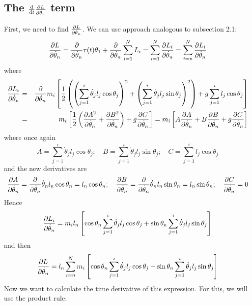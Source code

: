 \documentclass[12pt]{article}
\begin{document}
	\subsection{The $\dv{t}\pdv{L}{\dot{\theta}_n}$ term}
	
	First, we need to find $\pdv{L}{\dot{\theta}_n}$. We can use approach analogous to subsection 2.1:
	$$\pdv{L}{\dot{\theta}_n}=\pdv{}{\dot{\theta}_n}\tau(t)\theta_1+\pdv{\dot{\theta}_n}\sum_{i=1}^N L_i=\sum_{i=1}^N \pdv{L_i}{\dot{\theta}_n}=\sum_{i=n}^N \pdv{L_i}{\dot{\theta}_n}$$
	where
	\begin{eqnarray*}
	\pdv{L_i}{\dot{\theta}_n}&=&\pdv{\dot{\theta}_n}m_i\left[\frac{1}{2}\left(\left(\sum_{j=1}^i \dot{\theta}_j l_j \cos{\theta_j}\right)^2+\left(\sum_{j=1}^i \dot{\theta}_j l_j \sin{\theta_j}\right)^2\right)+g\sum_{j=1}^i l_j \cos{\theta_j}\right]\\
	&=&m_i\left[\frac{1}{2}\left(\pdv{A^2}{\dot{\theta}_n}+\pdv{B^2}{\dot{\theta}_n}\right)+g\pdv{C}{\dot{\theta}_n}\right]=m_i\left[A\pdv{A}{\dot{\theta}_n}+B\pdv{B}{\dot{\theta}_n}+g\pdv{C}{\dot{\theta}_n}\right]
	\end{eqnarray*}
	where once again
	$$A=\sum_{j=1}^i \dot{\theta}_j l_j \cos{\theta_j};\quad B=\sum_{j=1}^i \dot{\theta}_j l_j \sin{\theta_j};\quad C=\sum_{j=1}^i l_j \cos{\theta_j}$$
	and the new derivatives are
	$$\pdv{A}{\dot{\theta}_n}=\pdv{\dot{\theta}_n}\dot{\theta}_n l_n \cos{\theta_n}=l_n \cos{\theta_n};\quad \pdv{B}{\dot{\theta}_n}=\pdv{\dot{\theta}_n} \dot{\theta}_n l_n \sin{\theta_n}=l_n \sin{\theta_n};\quad \pdv{C}{\dot{\theta}_n}=0$$
	Hence
	$$\pdv{L_i}{\dot{\theta}_n}=m_il_n\left[\cos{\theta_n}\sum_{j=1}^i \dot{\theta}_j l_j \cos{\theta_j}+ \sin{\theta_n}\sum_{j=1}^i \dot{\theta}_j l_j \sin{\theta_j}\right]$$
	and then
	$$\pdv{L}{\dot{\theta}_n}=l_n\sum_{i=n}^N m_i\left[\cos{\theta_n}\sum_{j=1}^i \dot{\theta}_j l_j \cos{\theta_j}+ \sin{\theta_n}\sum_{j=1}^i \dot{\theta}_j l_j \sin{\theta_j}\right]$$
	Now we want to calculate the time derivative of this expression. For this, we will use the product rule:
\end{document}
